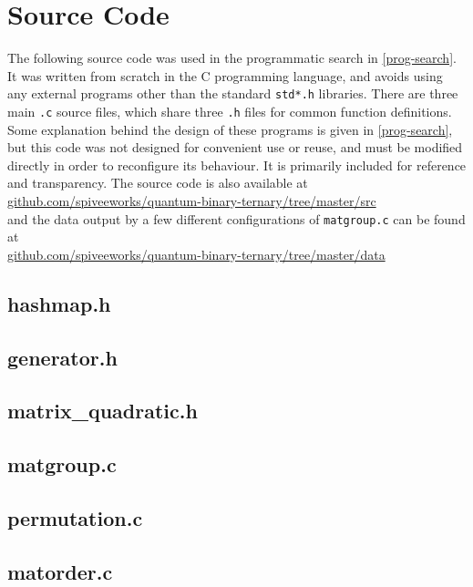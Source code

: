 
\chapter[SOURCE CODE]{Source Code}

The following source code was used in the programmatic search in \autoref{prog-search}. It was written from scratch in the C programming language, and avoids using any external programs other than the standard \verb`std*.h` libraries. There are three main \verb`.c` source files, which share three \verb`.h` files for common function definitions. Some explanation behind the design of these programs is given in \autoref{prog-search}, but this code was not designed for convenient use or reuse, and must be modified directly in order to reconfigure its behaviour. It is primarily included for reference and transparency. The source code is also available at\\
\url{github.com/spiveeworks/quantum-binary-ternary/tree/master/src}
\\and the data output by a few different configurations of \verb`matgroup.c` can be found at \\
\url{github.com/spiveeworks/quantum-binary-ternary/tree/master/data}

\section{hashmap.h}
\lstset{language=c}

\clearpage
\section{generator.h}

\clearpage
\section{matrix{\_}quadratic.h}

\clearpage
\section{matgroup.c}

\clearpage
\section{permutation.c}

\clearpage
\section{matorder.c}
